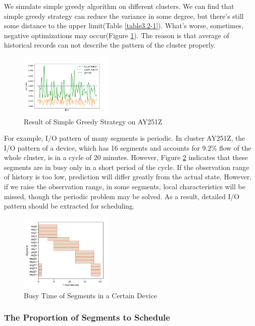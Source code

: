 \documentclass[letterpaper,twocolumn,10pt]{article}
\begin{document}
We simulate simple greedy algorithm on different clusters.
We can find that simple greedy strategy can reduce the
variance in some degree, but there's still some distance
to the upper limit(Table \ref{table3.2-1}). What's worse,
sometimes, negative optimizations may occur(Figure
\ref{fig3.2-1}). The reason is that average of historical 
records can not describe the pattern of the cluster
properly. 

\begin{figure}[h]
    \centering
    \includegraphics[width=0.4\textwidth]{Figure-3.2/Figure_1.png}
    \caption{Result of Simple Greedy Strategy on AY251Z}
    \label{fig3.2-1}
\end{figure}

For example, I/O pattern of many segments is periodic. In
cluster AY251Z, the I/O pattern of a device, which has 16
segments and accounts for 9.2\% flow of the whole cluster,
is in a cycle of 20 minutes. However, Figure \ref{fig3.2-2}
indicates that these segments are in busy only in a short period of the cycle. If the observation range of history is
too low, prediction will differ greatly from the actual
state. However, if we raise the observation range, in some
segments, local characteristics will be missed, though the
periodic problem may be solved. As a result, detailed I/O
pattern should be extracted for scheduling.
\begin{figure}[h]
    \centering
    \includegraphics[width=0.4\textwidth]{Figure-3.2/Figure_2.png}
    \caption{Busy Time of Segments in a Certain Device}
    \label{fig3.2-2}
\end{figure}

\subsubsection{The Proportion of Segments to Schedule}\label{sec3.2-4}
\end{document}
